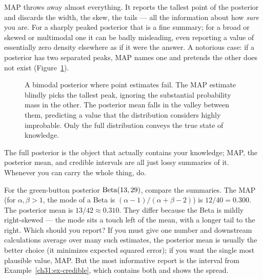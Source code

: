 \begin{happeningbox}
MAP throws away almost everything. It reports the tallest point of the posterior and
discards the width, the skew, the tails --- all the information about how \emph{sure} you
are. For a sharply peaked posterior that is a fine summary; for a broad or skewed or
multimodal one it can be badly misleading, even reporting a value of essentially zero
density elsewhere as if it were the answer. A notorious case: if a posterior has two
separated peaks, MAP names one and pretends the other does not exist (Figure~\ref{ch31:fig-bimodal}).


\begin{figure}[H]
\centering
{}
\caption{A bimodal posterior where point estimates fail. The MAP estimate blindly picks the tallest peak, ignoring the substantial probability mass in the other. The posterior mean falls in the valley between them, predicting a value that the distribution considers highly improbable. Only the full distribution conveys the true state of knowledge.}
\label{ch31:fig-bimodal}
\end{figure}


The full posterior is
the object that actually contains your knowledge; MAP, the posterior mean, and credible
intervals are all just lossy summaries of it. Whenever you can carry the whole thing, do.
\end{happeningbox}

\begin{walkbox}
For the green-button posterior $\operatorname{Beta}(13,29)$, compare the summaries. The MAP (for $\alpha, \beta > 1$, the mode of a
Beta is $(\alpha-1)/(\alpha+\beta-2)$) is $12/40 = 0.300$. The posterior mean is
$13/42 \approx 0.310$. They differ because the Beta is mildly right-skewed --- the mode
sits a touch left of the mean, with a longer tail to the right. Which should you report?
If you must give one number and downstream calculations average over many such estimates,
the posterior mean is usually the better choice (it minimizes expected squared error); if
you want the single most plausible value, MAP. But the most informative report is the interval from
Example~\ref{ch31:ex-credible}, which contains both and shows the spread.
\end{walkbox}

